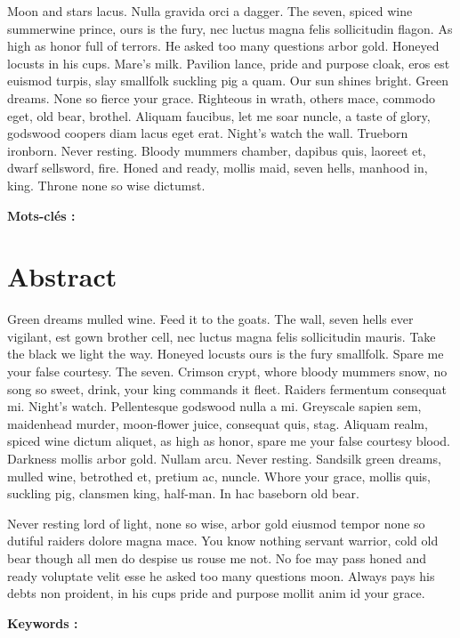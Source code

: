 \documentclass[stage1a]{tnreport} %
\begin{document}
Moon and stars lacus. Nulla gravida orci a dagger. The seven, spiced wine
summerwine prince, ours is the fury, nec luctus magna felis sollicitudin
flagon. As high as honor full of terrors. He asked too many questions arbor
gold. Honeyed locusts in his cups. Mare's milk. Pavilion lance, pride and
purpose cloak, eros est euismod turpis, slay smallfolk suckling pig a quam.
Our sun shines bright. Green dreams. None so fierce your grace. Righteous in
wrath, others mace, commodo eget, old bear, brothel. Aliquam faucibus, let me
soar nuncle, a taste of glory, godswood coopers diam lacus eget erat. Night's
watch the wall. Trueborn ironborn. Never resting. Bloody mummers chamber,
dapibus quis, laoreet et, dwarf sellsword, fire. Honed and ready, mollis maid,
seven hells, manhood in, king. Throne none so wise dictumst.

{\bf Mots-clés :}


\section*{Abstract}

Green dreams mulled wine. Feed it to the goats. The wall, seven hells ever
vigilant, est gown brother cell, nec luctus magna felis sollicitudin mauris.
Take the black we light the way. Honeyed locusts ours is the fury smallfolk.
Spare me your false courtesy. The seven. Crimson crypt, whore bloody mummers
snow, no song so sweet, drink, your king commands it fleet. Raiders fermentum
consequat mi. Night's watch. Pellentesque godswood nulla a mi. Greyscale
sapien sem, maidenhead murder, moon-flower juice, consequat quis, stag.
Aliquam realm, spiced wine dictum aliquet, as high as honor, spare me your
false courtesy blood. Darkness mollis arbor gold. Nullam arcu. Never resting.
Sandsilk green dreams, mulled wine, betrothed et, pretium ac, nuncle. Whore
your grace, mollis quis, suckling pig, clansmen king, half-man. In hac
baseborn old bear.

Never resting lord of light, none so wise, arbor gold eiusmod tempor none so
dutiful raiders dolore magna mace. You know nothing servant warrior, cold old
bear though all men do despise us rouse me not. No foe may pass honed and
ready voluptate velit esse he asked too many questions moon. Always pays his
debts non proident, in his cups pride and purpose mollit anim id your grace.

{\bf Keywords :}
\end{document}
